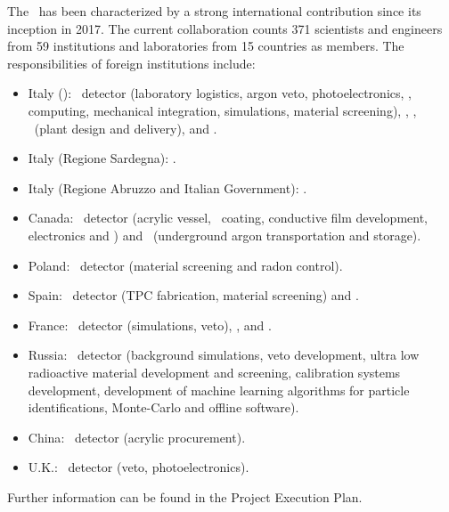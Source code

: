 The \GADMC\  has been characterized by a strong international contribution since its inception in 2017. The current collaboration counts 371 scientists and engineers from 59 institutions and laboratories from 15 countries as members. 
The responsibilities of foreign institutions include:
\begin{itemize}
\item{Italy (\INFN)}: \DSks\ detector (laboratory logistics, argon veto, photoelectronics, \DAQ, computing, mechanical integration, simulations, material screening), \ReD, \Aria, \Urania\ (plant design and delivery), and \DArT.
\item{Italy (Regione Sardegna)}: \Aria.
\item{Italy (Regione Abruzzo and Italian Government)}: \NOA.
\item{Canada}: \DSks\ detector (acrylic vessel, \TPB\ coating, conductive film development, electronics and \DAQ) and \Urania\ (underground argon transportation and storage).
\item{Poland}: \DSks\ detector (material screening and radon control).
\item{Spain}: \DSks\ detector (TPC fabrication, material screening) and \DArT.
\item{France}: \DSks\ detector (simulations, veto), \ARIS, and \ReD.
\item{Russia}: \DSks\ detector (background simulations, veto development, ultra low radioactive  material development and screening, calibration systems development, development of machine learning algorithms for particle identifications, Monte-Carlo and offline software).
\item{China}: \DSks\ detector (acrylic procurement).
\item{U.K.}: \DSks\ detector (veto, photoelectronics).
\end{itemize}

Further information can be found in the Project Execution Plan.